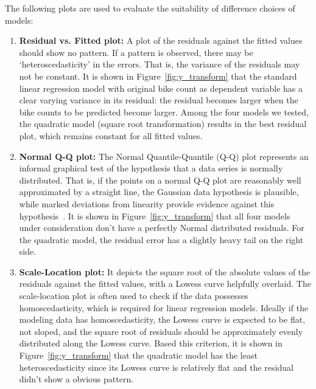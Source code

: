 \documentclass [11pt, proquest] {uwthesis}[2015/03/03]
\begin{document}
The following plots are used to evaluate the suitability of difference choices of models:
\begin{enumerate}
\item \textbf{Residual vs. Fitted plot:} A plot of the residuals against the fitted values should show no pattern. If a pattern is observed, there may be `heteroscedasticity' in the errors. That is, the variance of the residuals may not be constant. It is shown in Figure~\ref{fig:y_transform} that the standard linear regression model with original bike count as dependent variable has a clear varying variance in its residual: the residual becomes larger when the bike counts to be predicted become larger. Among the four  models we tested, the quadratic model (square root transformation) results in the best residual plot, which remains constant for all fitted values. 
\item \textbf{Normal Q-Q plot:} The Normal Quantile-Quantile (Q-Q) plot represents an informal graphical test of the hypothesis that a data series is normally distributed. That is, if the points on a normal Q-Q plot are reasonably well approximated by a straight line, the Gaussian data hypothesis is plausible, while marked deviations from linearity provide evidence against this hypothesis~\cite{Pearson2011}. It is shown in Figure~\ref{fig:y_transform} that all four models under consideration don't have a perfectly Normal distributed residuals. For the quadratic model, the residual error has a slightly heavy tail on the right side. 
\item \textbf{Scale-Location plot:} It depicts the square root of the absolute values of the residuals against the fitted values, with a Lowess curve helpfully overlaid. The scale-location plot is often used to check if the data possesses homoscedasticity, which is required for linear regression models. Ideally if the modeling data has homoscedasticity, the Lowess curve is expected to be flat, not sloped, and the square root of residuals should be approximately evenly distributed along the Lowess curve. Based this criterion, it is shown in Figure~\ref{fig:y_transform} that the quadratic model has the least heteroscedasticity since its Lowess curve is relatively flat and the residual didn't show a obvious pattern.

\end{enumerate}
\end{document}
